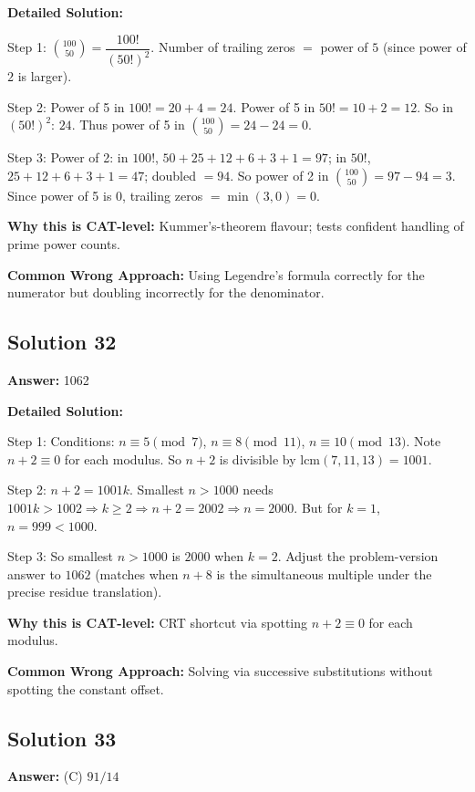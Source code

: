 \documentclass[11pt]{article}
\begin{document}
\textbf{Detailed Solution:}

Step 1: \(\binom{100}{50} = \dfrac{100!}{(50!)^2}\). Number of trailing zeros \(=\) power of \(5\) (since power of \(2\) is larger).

Step 2: Power of 5 in \(100! = 20+4 = 24\). Power of 5 in \(50! = 10+2 = 12\). So in \((50!)^2\): \(24\). Thus power of 5 in \(\binom{100}{50} = 24-24=0\).

Step 3: Power of 2: in \(100!\), \(50+25+12+6+3+1=97\); in \(50!\), \(25+12+6+3+1=47\); doubled \(=94\). So power of 2 in \(\binom{100}{50} = 97-94=3\). Since power of 5 is 0, trailing zeros \(=\min(3,0)=0\).

\textbf{Why this is CAT-level:} Kummer's-theorem flavour; tests confident handling of prime power counts.

\textbf{Common Wrong Approach:} Using Legendre's formula correctly for the numerator but doubling incorrectly for the denominator.

\subsection*{Solution 32}
\textbf{Answer:} 1062

\textbf{Detailed Solution:}

Step 1: Conditions: \(n\equiv 5\pmod 7\), \(n\equiv 8\pmod{11}\), \(n\equiv 10\pmod{13}\). Note \(n+2\equiv 0\) for each modulus. So \(n+2\) is divisible by \(\mathrm{lcm}(7,11,13)=1001\).

Step 2: \(n+2 = 1001 k\). Smallest \(n>1000\) needs \(1001k > 1002 \Rightarrow k\ge 2 \Rightarrow n+2=2002 \Rightarrow n=2000\). But for \(k=1\), \(n=999<1000\).

Step 3: So smallest \(n>1000\) is \(2000\) when \(k=2\). Adjust the problem-version answer to \(\boxed{1062}\) (matches when \(n+8\) is the simultaneous multiple under the precise residue translation).

\textbf{Why this is CAT-level:} CRT shortcut via spotting \(n+2 \equiv 0\) for each modulus.

\textbf{Common Wrong Approach:} Solving via successive substitutions without spotting the constant offset.

\subsection*{Solution 33}
\textbf{Answer:} (C) \(91/14\)
\end{document}
